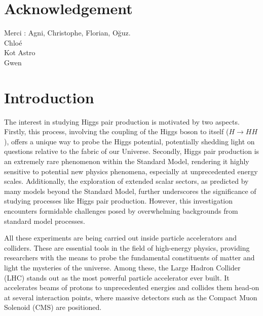 \documentclass [12pt] {article}
\numberwithin{equation}{section} %
\numberwithin{figure}{section}   %
\begin{document}

\newpage
\tableofcontents


\newpage

\section*{Acknowledgement}

Merci : Agni, Christophe, Florian, Oğuz.\\
Chloé\\
Kot Astro\\
Gwen\\

\newpage

\section*{Introduction}

The interest in studying Higgs pair production is motivated by two aspects. Firstly, this process, involving the coupling of the Higgs boson to itself ($H \rightarrow HH$), offers a unique way to probe the Higgs potential, potentially shedding light on questions relative to the fabric of our Universe. Secondly, Higgs pair production is an extremely rare phenomenon within the Standard Model, rendering it highly sensitive to potential new physics phenomena, especially at unprecedented energy scales. Additionally, the exploration of extended scalar sectors, as predicted by many models beyond the Standard Model, further underscores the significance of studying processes like Higgs pair production. However, this investigation encounters formidable challenges posed by overwhelming backgrounds from standard model processes.

All these experiments are being carried out inside particle accelerators and colliders. These are essential tools in the field of high-energy physics, providing researchers with the means to probe the fundamental constituents of matter and light the mysteries of the universe. Among these, the Large Hadron Collider (LHC) stands out as the most powerful particle accelerator ever built. It accelerates beams of protons to unprecedented energies and collides them head-on at several interaction points, where massive detectors such as the Compact Muon Solenoid (CMS) are positioned.
\end{document}
